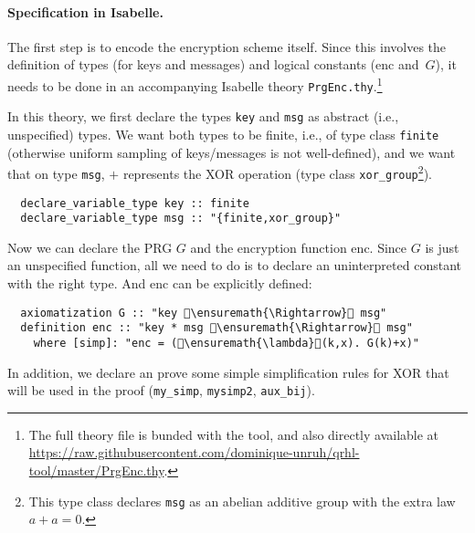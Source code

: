\documentclass{article}
\newcommand\giturl[1]{\url{https://raw.githubusercontent.com/dominique-unruh/qrhl-tool/master/#1}}
\begin{document}
\paragraph{Specification in Isabelle.} The first step is to encode the
encryption scheme itself. Since this involves the definition of types
(for keys and messages) and logical constants ($\mathrm{enc}$
and~$G$),
it needs to be done in an accompanying Isabelle theory
\texttt{PrgEnc.thy}.\footnote{The full theory file is bunded with the tool,
  and also directly available at \giturl{PrgEnc.thy}.}

In this theory, we first declare the types \texttt{key} and
\texttt{msg} as abstract (i.e., unspecified) types. We want both types
to be finite, i.e., of type class \texttt{finite} (otherwise uniform
sampling of keys/messages is not well-defined), and we want that on
type \texttt{msg}, $+$
represents the XOR operation (type class \texttt{xor\_group}\footnote{This type class
  declares \texttt{msg} as an abelian additive group with the extra law $a+a=0$.}).
\begin{lstlisting}
  declare_variable_type key :: finite
  declare_variable_type msg :: "{finite,xor_group}"
\end{lstlisting}

Now we can declare the PRG $G$
and the encryption function $\mathrm{enc}$.
Since $G$
is just an unspecified function, all we need to do is to declare an
uninterpreted constant with the right type. And $\mathrm{enc}$
can be explicitly defined:
\begin{lstlisting}
  axiomatization G :: "key \ensuremath{\Rightarrow} msg"
  definition enc :: "key * msg \ensuremath{\Rightarrow} msg"
    where [simp]: "enc = (\ensuremath{\lambda}(k,x). G(k)+x)"
\end{lstlisting}

In addition, we declare an prove some simple simplification rules for XOR
that will be used in the proof (\texttt{my\_simp}, \texttt{mysimp2}, \texttt{aux\_bij}).
\end{document}
